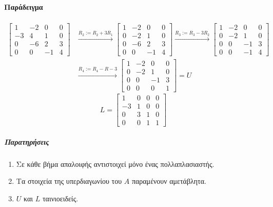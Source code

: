 \documentclass[11pt,a4paper,notitlepage,fleqn,final]{article}
\begin{document}
\paragraph{Παράδειγμα}
\begin{align*}
	\left[\begin{matrix}
	1&-2&0&0\\-3&4&1&0\\0&-6&2&3\\0&0&-1&4
	\end{matrix}\right]
	&\xrightarrow{R_2:=R_2+3R_1}
	\left[\begin{matrix}
	1&-2&0&0\\0&-2&1&0\\0&-6&2&3\\0&0&-1&4
	\end{matrix}\right] \xrightarrow{R_3:=R_3-3R_2}\left[
	\begin{matrix}
	1&-2&0&0\\0&-2&1&0\\0&0&-1&3\\0&0&-1&4
	\end{matrix}
	\right] \\
	&
	\xrightarrow{R_4:=R_4-R-3}\left[\begin{matrix}
	1&-2&0&0\\0&-2&1&0\\0&0&-1&3\\0&0&0&1
	\end{matrix}\right] = U
\end{align*}
\[
L=\left[\begin{matrix}
1&0&0&0\\-3&1&0&0\\0&3&1&0\\0&0&1&1
\end{matrix}\right]
\]
\subparagraph{Παρατηρήσεις}
\begin{enumerate}
	\item Σε κάθε βήμα απαλοιφής αντιστοιχεί μόνο ένας
	πολλαπλασιαστής.
	\item Τα στοιχεία της υπερδιαγωνίου του \( A \) παραμένουν
	αμετάβλητα.
	\item \( U \) και \( L \) ταινιοειδείς.
\end{enumerate}
\end{document}
